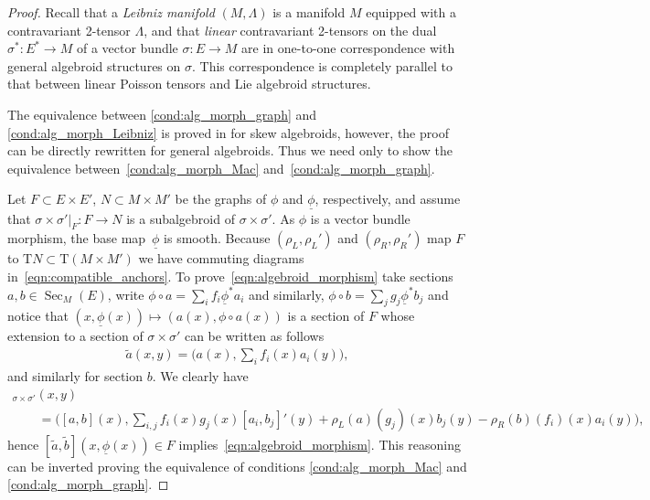 \documentclass[pdftex]{sigma}
\newcommand{\und}{\underline}
\newcommand{\Sec}{\operatorname{Sec}}
\newcommand{\ra}{\rightarrow}
\newcommand{\rhoL}{\rho_L} %
\newcommand{\rhoR}{\rho_R}
\newcommand{\T}{\mathrm{T}} %
\numberwithin{equation}{section}
\theoremstyle{definition}
\begin{document}
\begin{proof}Recall \cite{JG_PU_Algebroids_1999} that a \emph{Leibniz manifold} $(M, \Lambda)$ is a manifold $M$ equipped with a contravariant 2-tensor $\Lambda$, and that \emph{linear} contravariant 2-tensors on the dual $\sigma^\ast\colon E^\ast\ra M$ of a vector bundle $\sigma\colon E \ra M$ are in one-to-one correspondence with general algebroid structures on $\sigma$. This correspondence is completely parallel to that between linear Poisson tensors and Lie algebroid structures.

The equivalence between \eqref{cond:alg_morph_graph} and \eqref{cond:alg_morph_Leibniz} is proved in \cite[Theorem~5.1]{JG_mod_class_skew_alg_rel_2012} for skew algebroids, however, the proof can be directly rewritten for general algebroids. Thus we need only to show the equivalence between~\eqref{cond:alg_morph_Mac} and~\eqref{cond:alg_morph_graph}.

Let $F\subset E\times E'$, $N\subset M\times M'$ be the graphs of $\phi$ and $\und{\phi}$, respectively, and assume that $\sigma\times \sigma'|_F\colon F\ra N$ is a subalgebroid of $\sigma\times \sigma'$. As $\phi$ is a vector bundle morphism, the base map~$\und{\phi}$ is smooth. Because $(\rhoL, \rhoL')$ and $(\rhoR, \rhoR')$ map $F$ to $\T N \subset \T(M\times M')$ we have commuting diagrams in~\eqref{eqn:compatible_anchors}. To prove~\eqref{eqn:algebroid_morphism} take sections $a,b\in\Sec_M(E)$, write $\phi\circ a = \sum_i f_i \und{\phi}^\ast a_i$ and similarly, $\phi\circ b = \sum_j g_j \und{\phi}^\ast b_j$
and notice that $(x, \und{\phi}(x))\mapsto (a(x), \phi \circ a(x))$ is a section of $F$ whose extension to a section of $\sigma\times \sigma'$ can be written as follows
\begin{gather*}
\tilde{a}(x, y) = \bigg(a(x), \sum_i f_i(x) a_i(y)\bigg),
\end{gather*}
and similarly for section $b$. We clearly have
\begin{gather*}
[\tilde{a}, \tilde{b}]_{\sigma\times \sigma'}(x, y) \\
\qquad{} = \bigg([a, b](x), \sum_{i,j} f_i(x) g_j(x) [a_i, b_j]'(y) + \rhoL(a)(g_j)(x)b_j(y) - \rhoR(b)(f_i)(x) a_i(y) \bigg),
\end{gather*}
hence $[\tilde{a}, \tilde{b}](x, \und{\phi}(x)) \in F$ implies~\eqref{eqn:algebroid_morphism}. This reasoning can be inverted proving the equivalence of conditions \eqref{cond:alg_morph_Mac} and \eqref{cond:alg_morph_graph}.
\end{proof}
\end{document}
